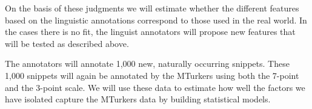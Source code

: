 \documentclass[10pt]{article}
\begin{document}
On the basis of these judgments we will estimate whether the different features based on the linguistic annotations correspond to those used in the real world. In the cases there is no fit, the linguist annotators will propose new features that will be tested as described above. 

The annotators will annotate 1,000 new, naturally occurring snippets. These 1,000 snippets will again be annotated by the MTurkers using both the 7-point and the 3-point scale. We will use these data to estimate how well the factors we have isolated capture the MTurkers data by building statistical models.








\end{document}
